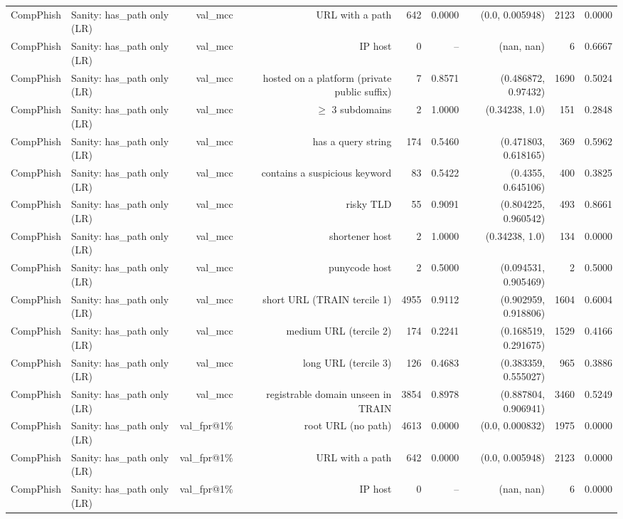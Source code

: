 \begin{table}[t]
\begin{tabular}{llrrrrrrr}
CompPhish & Sanity: has\_path only (LR) & val\_mcc & URL with a path & 642 & 0.0000 & (0.0, 0.005948) & 2123 & 0.0000 \\
CompPhish & Sanity: has\_path only (LR) & val\_mcc & IP host & 0 & -- & (nan, nan) & 6 & 0.6667 \\
CompPhish & Sanity: has\_path only (LR) & val\_mcc & hosted on a platform (private public suffix) & 7 & 0.8571 & (0.486872, 0.97432) & 1690 & 0.5024 \\
CompPhish & Sanity: has\_path only (LR) & val\_mcc & $\geq$ 3 subdomains & 2 & 1.0000 & (0.34238, 1.0) & 151 & 0.2848 \\
CompPhish & Sanity: has\_path only (LR) & val\_mcc & has a query string & 174 & 0.5460 & (0.471803, 0.618165) & 369 & 0.5962 \\
CompPhish & Sanity: has\_path only (LR) & val\_mcc & contains a suspicious keyword & 83 & 0.5422 & (0.4355, 0.645106) & 400 & 0.3825 \\
CompPhish & Sanity: has\_path only (LR) & val\_mcc & risky TLD & 55 & 0.9091 & (0.804225, 0.960542) & 493 & 0.8661 \\
CompPhish & Sanity: has\_path only (LR) & val\_mcc & shortener host & 2 & 1.0000 & (0.34238, 1.0) & 134 & 0.0000 \\
CompPhish & Sanity: has\_path only (LR) & val\_mcc & punycode host & 2 & 0.5000 & (0.094531, 0.905469) & 2 & 0.5000 \\
CompPhish & Sanity: has\_path only (LR) & val\_mcc & short URL (TRAIN tercile 1) & 4955 & 0.9112 & (0.902959, 0.918806) & 1604 & 0.6004 \\
CompPhish & Sanity: has\_path only (LR) & val\_mcc & medium URL (tercile 2) & 174 & 0.2241 & (0.168519, 0.291675) & 1529 & 0.4166 \\
CompPhish & Sanity: has\_path only (LR) & val\_mcc & long URL (tercile 3) & 126 & 0.4683 & (0.383359, 0.555027) & 965 & 0.3886 \\
CompPhish & Sanity: has\_path only (LR) & val\_mcc & registrable domain unseen in TRAIN & 3854 & 0.8978 & (0.887804, 0.906941) & 3460 & 0.5249 \\
CompPhish & Sanity: has\_path only (LR) & val\_fpr@1\% & root URL (no path) & 4613 & 0.0000 & (0.0, 0.000832) & 1975 & 0.0000 \\
CompPhish & Sanity: has\_path only (LR) & val\_fpr@1\% & URL with a path & 642 & 0.0000 & (0.0, 0.005948) & 2123 & 0.0000 \\
CompPhish & Sanity: has\_path only (LR) & val\_fpr@1\% & IP host & 0 & -- & (nan, nan) & 6 & 0.0000 \\

\end{tabular}
\end{table}
